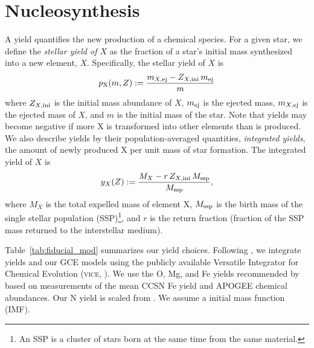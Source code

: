 \documentclass[fleqn,
usenatbib]{mnras}
\newcommand{\VICE}{\textsc{vice}}
\newcommand{\y}{p}
\begin{document}
\section{Nucleosynthesis}\label{sec:nucleosynthesis}

A yield quantifies the new production of a chemical species. For a given star, we define the {\it stellar yield of $X$} as the fraction of a star's initial mass synthesized into a new element, $X$. Specifically, the stellar yield of $X$ is
\begin{equation} \label{eq:stellar_yield_def}
   \y_{\rm X}(m, Z) := 
    \frac{m_{X, \rm ej}- Z_{X,\rm  ini}\,m_{\rm ej}}{m}
\end{equation}
where $Z_{X,\rm ini}$ is the initial mass abundance of $X$, $m_{\rm ej}$ is the ejected mass, $m_{X, \rm ej}$ is the ejected mass of $X$, and $m$ is the initial mass of the star.
Note that yields may become negative if more X is transformed into other elements than is produced.
We also describe yields by their population-averaged quantities, {\it integrated yields}, the amount of newly produced X per unit mass of star formation. 
The integrated yield of $X$ is
\begin{equation} 
   y_{X}(Z) := 
    \frac{M_X - r\,Z_{X, \rm ini}\,M_{\rm ssp}}{M_{\rm ssp}},
\end{equation}
where $M_X$ is the total expelled mass of element X, $M_{\rm ssp}$ is the birth mass of the single stellar population (SSP)\footnote{An SSP is a cluster of stars born at the same time from the same material.}, and $r$ is the return fraction (fraction of the SSP mass returned to the interstellar medium). 

Table~\ref{tab:fiducial_mod} summarizes our yield choices. 
Following \citet{james+23}, we integrate yields and our GCE models using the publicly available Versatile Integrator for Chemical Evolution (\VICE, \citealt{JW20}). We use the O, Mg, and Fe yields recommended by \citet{david_fe} based on measurements of the mean CCSN Fe yield \citep{rodriguez+23} and APOGEE chemical abundances.
Our N yield is scaled from \citep{james+23}.
We assume a \citet{kroupa01} initial mass function (IMF).
\end{document}
